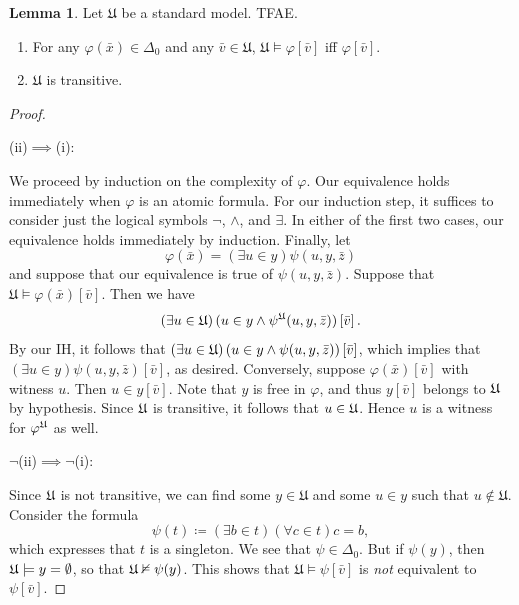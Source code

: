 \documentclass[10pt,letterpaper,cm]{nupset}
\theoremstyle{definition}
\theoremstyle{theorem}
\newtheorem{lemma}[definition]{Lemma}
\theoremstyle{remark}
\newcommand{\1}{\mathbf{1}}
\newcommand{\0}{\vec 0}
\newcommand{\be}{\begin{enumerate}}
\newcommand{\ee}{\end{enumerate}}
\begin{document}
\begin{lemma}\label{d0abs}
 Let $\mathfrak{U}$ be a standard model. TFAE. 
\be[label=(\roman*)]
\item For any $\varphi(\bar{x}) \in \Delta_0$ and any $\bar{v} \in \mathfrak{U}$, $\mathfrak{U} \models \varphi\left[\bar{v}\right]$ iff $\varphi\left[\bar{v}\right]$.
\item $\mathfrak{U}$ is transitive.
\ee
\end{lemma}
\begin{proof} $ $

\smallskip

(ii)$\implies$(i):

We proceed by induction on the complexity of $\varphi$. Our equivalence holds immediately when $\varphi$ is an atomic formula.  For our induction step, it suffices to consider just the logical symbols $\neg$, $\land$, and $\exists$. In either of the first two cases, our equivalence holds immediately by induction.  Finally, let $$\varphi(\bar{x}) = \left(\exists u \in y\right)\psi(u, y, \bar{z})$$ and suppose that our equivalence is true of $\psi(u, y, \bar{z})$. Suppose that $\mathfrak{U} \models \varphi(\bar{x})\left[\bar{v}\right]$. Then we have $$\left(\exists u\in \frak{U}\right)(u \in y \land \psi^{\frak{U}}(u, y, \bar{z}))\left[\bar{v}\right].$$ By our IH, it follows that $\left(\exists u\in \frak{U}\right)(u \in y \land \psi(u, y, \bar{z}))\left[\bar{v}\right]$, which implies that $\left(\exists u \in y\right) \psi(u, y, \bar{z})\left[\bar{v}\right]$, as desired. Conversely, suppose $\varphi(\bar{x})\left[\bar{v}\right]$ with witness $u$. Then $u\in y\left[\bar{v}\right]$.  Note that $y$ is free in $\varphi$, and thus $y\left[\bar{v}\right]$ belongs to $\frak{U}$ by hypothesis. Since $\frak{U}$ is transitive, it follows that $u\in \frak{U}$. Hence $u$ is a witness for $\varphi^{\frak{U}}$ as well. 

\smallskip

$\neg$(ii)$\implies \neg$(i): 

Since $\frak{U}$ is not transitive, we can find some $y\in \mathfrak{U}$ and some $u\in y$ such that $u\notin \mathfrak{U}$. Consider the formula $$\psi(t) \coloneqq \left(\exists b \in t\right)(\forall c \in t)c=b,$$ which expresses that $t$ is a singleton. We see that $\psi \in \Delta_0$. But if $\psi(y)$, then $\frak{U} \models y = \emptyset$, so that $\frak{U} \nvDash \psi(y)$. This shows that $\mathfrak{U} \models \psi\left[\bar{v}\right]$ is \emph{not} equivalent to $\psi\left[\bar{v}\right]$.
\end{proof}
\end{document}
